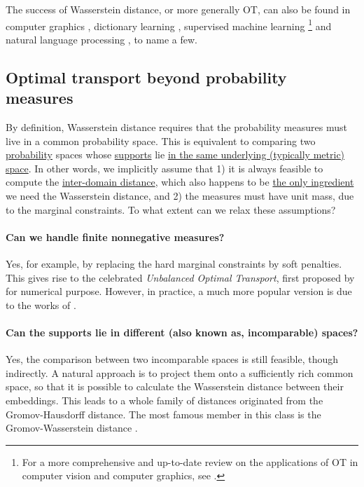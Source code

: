 The success of Wasserstein distance, or more generally OT, can also be found in
computer graphics \citep{Bonneel16,Solomon15}, dictionary learning \citep{Rolet16},
supervised machine learning \citep{Frogner15}
\footnote{For a more comprehensive and up-to-date review on the applications of OT in
computer vision and computer graphics, see \citep{Bonneel23}.} and
natural language processing \citep{Kusner15}, to name a few.

\subsection{Optimal transport beyond probability measures}

By definition, Wasserstein distance requires that the probability measures
must live in a common probability space. This is equivalent to comparing two
\underline{probability} spaces whose \underline{supports} lie
\underline{in the same underlying (typically metric) space}.
In other words, we implicitly assume that 1) it is always feasible to compute
the \underline{inter-domain distance}, which also happens to be \underline{the only ingredient}
we need the Wasserstein distance, and 2) the measures must have unit mass,
due to the marginal constraints. To what extent can we relax these assumptions?

\paragraph{Can we handle finite nonnegative measures?} Yes, for example,
by replacing the hard marginal constraints by soft penalties.
This gives rise to the celebrated \textit{Unbalanced Optimal Transport}, first proposed by
\citep{Benamou03} for numerical purpose. However, in practice, a much more popular version
is due to the works of \citep{Liero18,Frogner15}.

\paragraph{Can the supports lie in different (also known as, incomparable) spaces?}
Yes, the comparison between two incomparable spaces is still feasible, though indirectly.
A natural approach is to project them onto a sufficiently rich common space,
so that it is possible to calculate the Wasserstein distance between their embeddings.
This leads to a whole family of distances originated from the Gromov-Hausdorff distance.
The most famous member in this class is the Gromov-Wasserstein distance \citep{Memoli07,Memoli11}.

